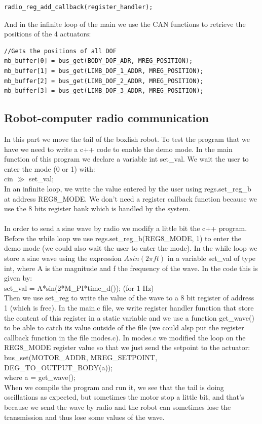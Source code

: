 \documentclass[11pt]{article}
\begin{document}
\begin{verbatim}
radio_reg_add_callback(register_handler);
\end{verbatim}

And in the infinite loop of the main we use the CAN functions to retrieve the positions of the 4 actuators:

\begin{verbatim}
//Gets the positions of all DOF
mb_buffer[0] = bus_get(BODY_DOF_ADR, MREG_POSITION);
mb_buffer[1] = bus_get(LIMB_DOF_1_ADDR, MREG_POSITION);
mb_buffer[2] = bus_get(LIMB_DOF_2_ADDR, MREG_POSITION);
mb_buffer[3] = bus_get(LIMB_DOF_3_ADDR, MREG_POSITION);
\end{verbatim}

\subsection{Robot-computer radio communication}

In this part we move the tail of the boxfish robot. To test the program that we have we need to write a c++ code to enable the demo mode. In the main function of this program we declare a variable int set\_val. We wait the user to enter the mode (0 or 1) with:
\\
cin $\gg$ set\_val;
\\
In an infinite loop, we write the value entered by the user using regs.set\_reg\_b at address REG8\_MODE. We don't need a register callback function because we use the 8 bits register bank which is handled by the system.
\\
\\
In order to send a sine wave by radio we modify a little bit the c++ program. Before the while loop we use regs.set\_reg\_b(REG8\_MODE, 1) to enter the demo mode (we could also wait the user to enter the mode). In the while loop we store a sine wave using the expression ${Asin(2{\pi}ft)}$ in a variable set\_val of type int, where A is the magnitude and f the frequency of the wave. In the code this is given by:
\\
set\_val = A*sin(2*M\_PI*time\_d()); (for 1 Hz)
\\
Then we use set\_reg to write the value of the wave to a 8 bit register of address 1 (which is free). In the main.c file, we write register handler function that store the content of this register in a static variable and we use a function get\_wave() to be able to catch its value outside of the file (we could alsp put the register callback function in the file modes.c). In modes.c we modified the loop on the REG8\_MODE register value so that we just send the setpoint to the actuator:
\\
bus\_set(MOTOR\_ADDR, MREG\_SETPOINT, DEG\_TO\_OUTPUT\_BODY(a));
\\
where a = get\_wave();
\\
When we compile the program and run it, we see that the tail is doing oscillations as expected, but sometimes the motor stop a little bit, and that's because we send the wave by radio and the robot can sometimes lose the transmission and thus lose some values of the wave.
\end{document}

